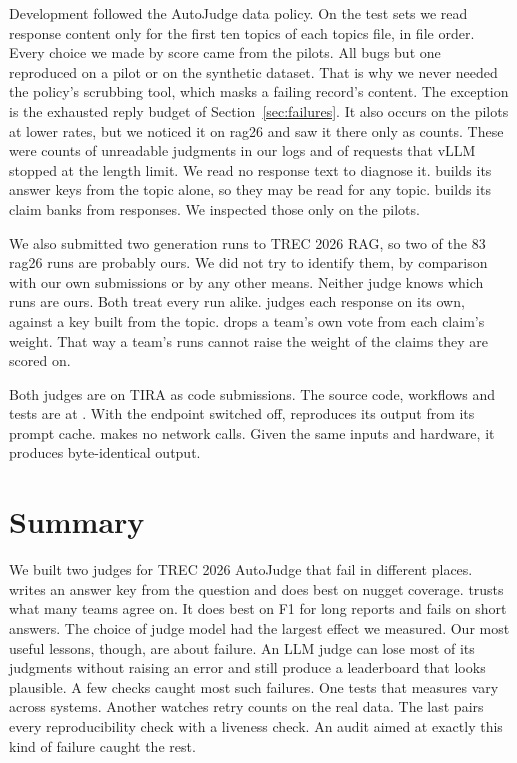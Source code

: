 Development followed the AutoJudge data policy. On the test sets we read response
content only for the first ten topics of each topics file, in file order. Every
choice we made by score came from the pilots. All bugs but one reproduced on a
pilot or on the synthetic dataset. That is why we
never needed the policy's scrubbing tool, which masks a failing record's content.
The exception is the exhausted reply budget of Section~\ref{sec:failures}. It also
occurs on the pilots at lower rates, but we noticed it on rag26 and saw it there
only as counts. These were counts of unreadable judgments in our logs and of
requests that vLLM stopped at the length limit. We read no response text to
diagnose it.  builds its answer keys from the topic alone, so
they may be read for any topic.  builds its
claim banks from responses. We inspected those only on the pilots.

We also submitted two generation runs to TREC 2026 RAG, so two of the 83 rag26 runs
are probably ours. We did not try to identify them, by comparison with our own
submissions or by any other means. Neither judge knows which runs are ours. Both
treat every run alike.  judges each response on its own,
against a key built from the topic.  drops a team's own vote
from each claim's weight. That way a team's runs cannot raise the weight of the
claims they are scored on.

Both judges are on TIRA as code submissions. The source code, workflows and tests
are at . With the endpoint switched off,
 reproduces its output from its prompt cache.  makes no network
calls. Given the same inputs and hardware, it produces byte-identical output.

\section{Summary}

We built two judges for TREC 2026 AutoJudge that fail in different places.
 writes an answer key from the question and does best on nugget
coverage.  trusts what many teams agree on. It does best on F1
for long reports and fails on short answers. The choice of judge model had the
largest effect we measured. Our most useful lessons, though, are about failure. An
LLM judge can lose most of its judgments without raising an error and still produce
a leaderboard that looks plausible. A few checks caught most such failures. One
tests that measures vary across systems. Another watches retry counts on the real
data. The last pairs every reproducibility check with a liveness check. An audit aimed at exactly this kind of
failure caught the rest.
